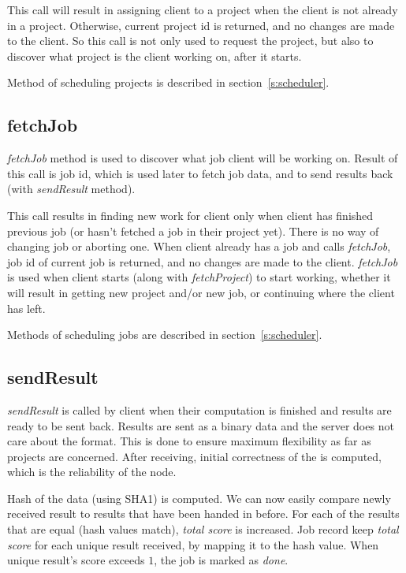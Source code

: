 This call will result in assigning client to a project when the client is not already in a project. Otherwise, current project id is returned, and no changes are made to the client. So this call is not only used to request the project, but also to discover what project is the client working on, after it starts.

Method of scheduling projects is described in section~\ref{s:scheduler}.

\subsection{fetchJob}

\emph{fetchJob} method is used to discover what job client will be working on. Result of this call is job id, which is used later to fetch job data, and to send results back (with \emph{sendResult} method).

This call results in finding new work for client only when client has finished previous job (or hasn't fetched a job in their project yet). There is no way of changing job or aborting one. When client already has a job and calls \emph{fetchJob}, job id of current job is returned, and no changes are made to the client. \emph{fetchJob} is used when client starts (along with \emph{fetchProject}) to start working, whether it will result in getting new project and/or new job, or continuing where the client has left.

Methods of scheduling jobs are described in section~\ref{s:scheduler}.

\subsection{sendResult}

\emph{sendResult} is called by client when their computation is finished and results are ready to be sent back. Results are sent as a binary data and the server does not care about the format. This is done to ensure maximum flexibility as far as projects are concerned. After receiving, initial correctness of the is computed, which is the reliability of the node. 

Hash of the data (using SHA1) is computed. We can now easily compare newly received result to results that have been handed in before. For each of the results that are equal (hash values match), \emph{total score} is increased. Job record keep \emph{total score} for each unique result received, by mapping it to the hash value. When unique result's score exceeds $1$, the job is marked as \emph{done}.

